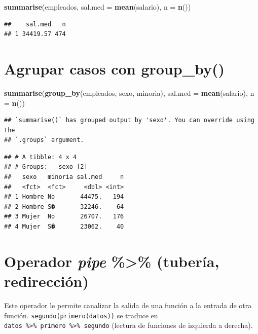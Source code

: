 \documentclass[
]{book}
\newenvironment{Shaded}{\begin{snugshade}}{\end{snugshade}}
\newcommand{\AttributeTok}[1]{\textcolor[rgb]{0.13,0.29,0.53}{#1}}
\newcommand{\FunctionTok}[1]{\textcolor[rgb]{0.13,0.29,0.53}{\textbf{#1}}}
\newcommand{\NormalTok}[1]{#1}
\begin{document}
\begin{Shaded}
\begin{Highlighting}[]
\FunctionTok{summarise}\NormalTok{(empleados, }\AttributeTok{sal.med =} \FunctionTok{mean}\NormalTok{(salario), }\AttributeTok{n =} \FunctionTok{n}\NormalTok{())}
\end{Highlighting}
\end{Shaded}

\begin{verbatim}
##    sal.med   n
## 1 34419.57 474
\end{verbatim}

\section{\texorpdfstring{Agrupar casos con \textbf{group\_by()}}{Agrupar casos con group\_by()}}\label{agrupar-casos-con-group_by}

\begin{Shaded}
\begin{Highlighting}[]
\FunctionTok{summarise}\NormalTok{(}\FunctionTok{group\_by}\NormalTok{(empleados, sexo, minoria), }\AttributeTok{sal.med =} \FunctionTok{mean}\NormalTok{(salario), }\AttributeTok{n =} \FunctionTok{n}\NormalTok{())}
\end{Highlighting}
\end{Shaded}

\begin{verbatim}
## `summarise()` has grouped output by 'sexo'. You can override using the
## `.groups` argument.
\end{verbatim}

\begin{verbatim}
## # A tibble: 4 x 4
## # Groups:   sexo [2]
##   sexo   minoria sal.med     n
##   <fct>  <fct>     <dbl> <int>
## 1 Hombre No       44475.   194
## 2 Hombre S�       32246.    64
## 3 Mujer  No       26707.   176
## 4 Mujer  S�       23062.    40
\end{verbatim}

\section{\texorpdfstring{Operador \emph{pipe} \textbf{\%\textgreater\%} (tubería, redirección)}{Operador pipe \%\textgreater\% (tubería, redirección)}}\label{operador-pipe-tuberuxeda-redirecciuxf3n}

Este operador le permite canalizar la salida de una función a la entrada de otra función.
\texttt{segundo(primero(datos))} se traduce en \texttt{datos\ \%\textgreater{}\%\ primero\ \%\textgreater{}\%\ segundo}
(lectura de funciones de izquierda a derecha).
\end{document}

